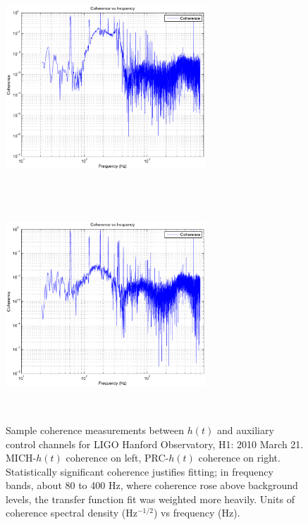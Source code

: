 \begin{figure}
\begin{center}
\includegraphics[height=80mm, width=75mm]{figure2a.eps}
\includegraphics[height=80mm, width=75mm]{figure2b.eps}
\caption{Sample coherence measurements between $h(t)$ and auxiliary control channels for LIGO Hanford Observatory, H1: 2010 March 21. MICH-$h(t)$ coherence on left, PRC-$h(t)$ coherence on right. Statistically significant coherence justifies fitting; in frequency bands, about 80 to 400 Hz, where coherence rose above background levels, the transfer function fit was weighted more heavily. Units of coherence spectral density (Hz$^{-1/2}$) vs frequency (Hz).}
\label{coherenceGraph}
\end{center}
\end{figure}
